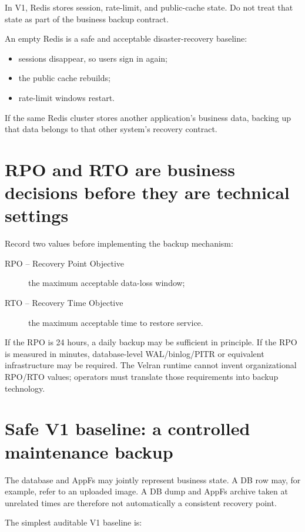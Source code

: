 In V1, Redis stores session, rate-limit, and public-cache state. Do not treat that state as part of the business backup contract.

An empty Redis is a safe and acceptable disaster-recovery baseline:

\begin{itemize}
  \item sessions disappear, so users sign in again;
  \item the public cache rebuilds;
  \item rate-limit windows restart.
\end{itemize}

If the same Redis cluster stores another application's business data, backing up that data belongs to that other system's recovery contract.

\section{RPO and RTO are business decisions before they are technical settings}

Record two values before implementing the backup mechanism:

\begin{description}
  \item[RPO -- Recovery Point Objective] the maximum acceptable data-loss window;
  \item[RTO -- Recovery Time Objective] the maximum acceptable time to restore service.
\end{description}

If the RPO is 24 hours, a daily backup may be sufficient in principle. If the RPO is measured in minutes, database-level WAL/binlog/PITR or equivalent infrastructure may be required. The Velran runtime cannot invent organizational RPO/RTO values; operators must translate those requirements into backup technology.

\section{Safe V1 baseline: a controlled maintenance backup}

The database and AppFs may jointly represent business state. A DB row may, for example, refer to an uploaded image. A DB dump and AppFs archive taken at unrelated times are therefore not automatically a consistent recovery point.

The simplest auditable V1 baseline is:

